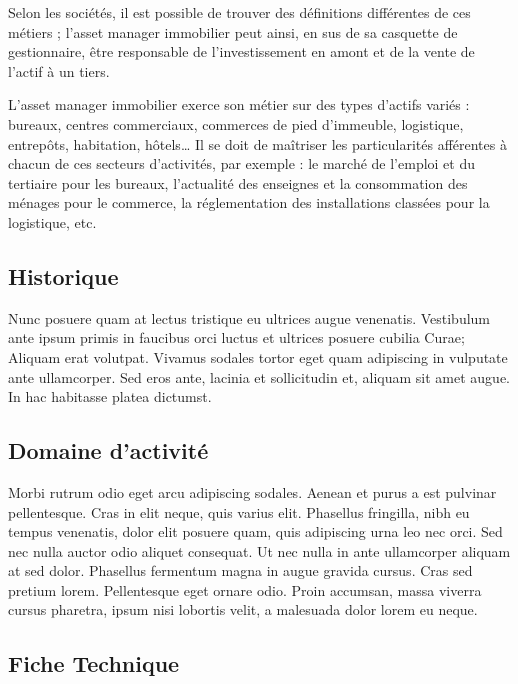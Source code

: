 \par Selon les sociétés, il est possible de trouver des définitions différentes de ces métiers ; l’asset manager immobilier peut ainsi, en sus de sa casquette de gestionnaire, être responsable de l'investissement en amont et de la vente de l'actif à un tiers.
\par L’asset manager immobilier exerce son métier sur des types d'actifs variés : bureaux, centres commerciaux, commerces de pied d'immeuble, logistique, entrepôts, habitation, hôtels… Il se doit de maîtriser les particularités afférentes à chacun de ces secteurs d'activités, par exemple : le marché de l'emploi et du tertiaire pour les bureaux, l'actualité des enseignes et la consommation des ménages pour le commerce, la réglementation des installations classées pour la logistique, etc.

\subsection{Historique}

Nunc posuere quam at lectus tristique eu ultrices augue venenatis. Vestibulum ante ipsum primis in faucibus orci luctus et ultrices posuere cubilia Curae; Aliquam erat volutpat. Vivamus sodales tortor eget quam adipiscing in vulputate ante ullamcorper. Sed eros ante, lacinia et sollicitudin et, aliquam sit amet augue. In hac habitasse platea dictumst.


\subsection{Domaine d'activité}
Morbi rutrum odio eget arcu adipiscing sodales. Aenean et purus a est pulvinar pellentesque. Cras in elit neque, quis varius elit. Phasellus fringilla, nibh eu tempus venenatis, dolor elit posuere quam, quis adipiscing urna leo nec orci. Sed nec nulla auctor odio aliquet consequat. Ut nec nulla in ante ullamcorper aliquam at sed dolor. Phasellus fermentum magna in augue gravida cursus. Cras sed pretium lorem. Pellentesque eget ornare odio. Proin accumsan, massa viverra cursus pharetra, ipsum nisi lobortis velit, a malesuada dolor lorem eu neque.



\subsection{Fiche Technique}

